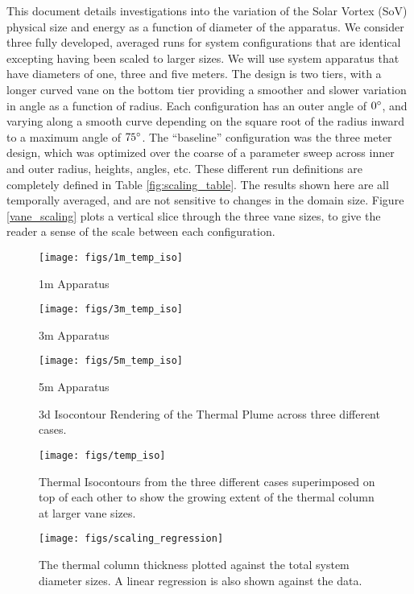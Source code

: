 \documentclass[english]{article}
\begin{document}
This document details investigations into the variation of the Solar Vortex (SoV) physical size and energy as a function of diameter of the apparatus. We consider 
three fully developed, averaged runs for system configurations that are identical excepting having been scaled to larger sizes. We will use 
system apparatus that have diameters of one, three and five meters. The design is two tiers, with a longer curved vane on the bottom tier providing a 
smoother and slower variation in angle as a function of radius. Each configuration has an outer angle of $0\degree$, and varying along a smooth curve 
depending on the square root of the radius inward to a maximum angle of $75\degree$. The ``baseline'' configuration was the three meter design, 
which was optimized over the coarse of a parameter sweep across inner and outer radius, heights, angles, etc. These different run 
definitions are completely defined in Table \ref{fig:scaling_table}. The results shown here are all temporally averaged, and are not sensitive to changes in the domain size.
%
%
Figure \ref{vane_scaling} plots a vertical slice through the three vane sizes, to give the reader a sense of the 
scale between each configuration.

\begin{figure}[!htb]
  \texttt{[image: figs/1m\_temp\_iso]}
  \caption*{1m Apparatus}\label{fig:1m_scaling}
\endminipage\hfill
{}
  \texttt{[image: figs/3m\_temp\_iso]}
  \caption*{3m Apparatus}\label{fig:3m_scaling}
\endminipage\hfill
{}%
  \texttt{[image: figs/5m\_temp\_iso]}
  \caption*{5m Apparatus}\label{fig:5m_scaling}
\endminipage
\caption{3d Isocontour Rendering of the Thermal Plume across three different cases.}
\label{fig:iso}
\end{figure}


\begin{figure}[!htb]
  \begin{center}
    \texttt{[image: figs/temp\_iso]}
    \caption{Thermal Isocontours from the three different cases superimposed 
      on top of each other to show the growing extent of the thermal column at larger vane sizes. }
    \label{fig:scaling_slice}
  \end{center}
\end{figure}

\begin{figure}[!htb]
  \begin{center}
    \texttt{[image: figs/scaling\_regression]}
    \caption{The thermal column thickness plotted against the total system diameter sizes. A linear regression is also shown against the data.}
    \label{fig:scaling_reg}
  \end{center}
\end{figure}
\end{document}
